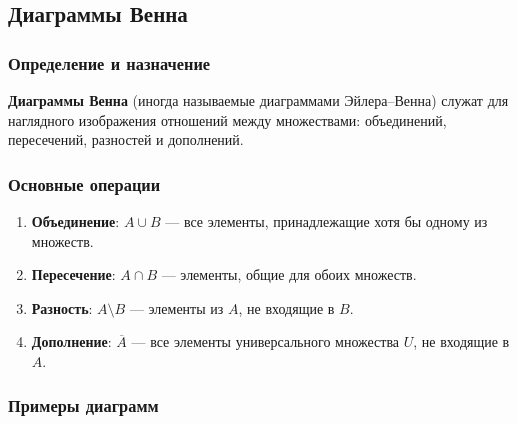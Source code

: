 \subsection{Диаграммы Венна}

\subsubsection{Определение и назначение}

\textbf{Диаграммы Венна} (иногда называемые диаграммами Эйлера–Венна) служат для наглядного изображения отношений между множествами: объединений, пересечений, разностей и дополнений.

\subsubsection{Основные операции}

\begin{enumerate}[label=\arabic*)]
  \item \textbf{Объединение}: \(A \cup B\) — все элементы, принадлежащие хотя бы одному из множеств.
  \item \textbf{Пересечение}: \(A \cap B\) — элементы, общие для обоих множеств.
  \item \textbf{Разность}: \(A \setminus B\) — элементы из \(A\), не входящие в \(B\).
  \item \textbf{Дополнение}: \(\overline{A}\) — все элементы универсального множества \(U\), не входящие в \(A\).
\end{enumerate}

\subsubsection{Примеры диаграмм}

